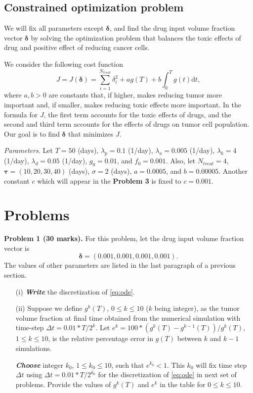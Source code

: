 \documentclass[11pt,a4paper]{article}
\newcommand{\dd}{\mathrm{d}}
\newcommand{\bolds}[1]{\boldsymbol{#1}}
\newcommand{\bfit}[1]{\textit{\textbf{#1}}}
\begin{document}
\subsection{Constrained optimization problem}
We will fix all parameters except $\bolds{\delta}$, and find the drug input volume fraction vector $\bolds{\delta}$ by solving the optimization problem that balances the toxic effects of drug and positive effect of reducing cancer cells. 

We consider the following cost function
\begin{equation}\label{eq:cost}
J = J(\bolds{\delta}) = \sum_{i=1}^{N_{treat}} \delta_i^2 + a g(T) + b \int_0^T g(t) \dd t,
\end{equation}
where $a,b>0$ are constants that, if higher, makes reducing tumor more important and, if smaller, makes reducing toxic effects more important. In the formula for $J$, the first term accounts for the toxic effects of drugs, and the second and third term accounts for the effects of drugs on tumor cell population. Our goal is to find $\bolds{\delta}$ that minimizes $J$. 


\vspace{10pt}
\noindent\textit{Parameters.} Let $T = 50$ (days), $\lambda_p = 0.1$ (1/day), $\lambda_a = 0.005$ (1/day), $\lambda_k = 4$ (1/day), $\lambda_d = 0.05$ (1/day), $g_0 = 0.01$, and $f_0 = 0.001$. Also, let $N_{treat} = 4$, $\bolds{\tau} = (10, 20, 30, 40)$ (days),  $\sigma = 2$ (days),  $a = 0.0005$, and $b = 0.00005$. Another constant $c$ which will appear in the \textbf{Problem 3} is fixed to $c = 0.001$.


\section{Problems}

\noindent\textbf{Problem 1 (30 marks).} For this problem, let the drug input volume fraction vector is
\begin{equation}
\bolds{\delta} = (0.001, 0.001, 0.001, 0.001).
\end{equation}
The values of other parameters are listed in the last paragraph of a previous section. 

\begin{itemize}
\item[(i)] \bfit{Write} the discretization of \eqref{eq:ode}.

\item[(ii)] Suppose we define $g^k(T)$, $0\leq k \leq 10$ ($k$ being integer), as the tumor volume fraction at final time obtained from the numerical simulation with time-step $\Delta t = 0.01*T/2^k$. Let $e^k = 100*(g^k(T) - g^{k-1}(T))/g^k(T)$, $1\leq k \leq 10$, is the relative percentage error in $g(T)$ between $k$ and $k-1$ simulations. 

\bfit{Choose} integer $k_0$, $1\leq k_0 \leq 10$, such that $e^{k_0} < 1$. This $k_0$ will fix time step $\Delta t$ using $\Delta t = 0.01*T/2^{k_0}$ for the discretization of \eqref{eq:ode} in next set of problems. Provide the values of $g^k(T)$ and $e^k$ in the table for $0\leq k \leq 10$.
\end{itemize}
\end{document}
